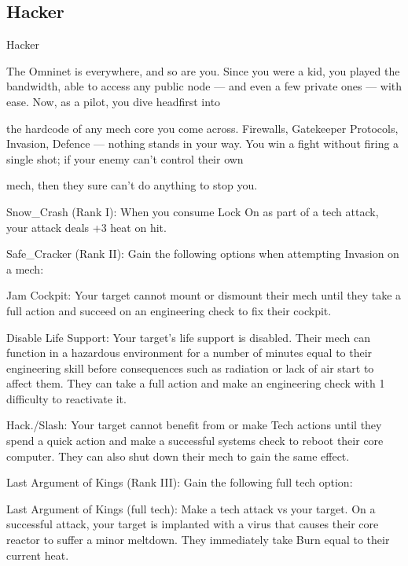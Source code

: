 \subsection{Hacker}

                                                     Hacker  

The Omninet is everywhere, and so are you. Since you were a kid, you played the bandwidth, able to  
access any public node — and even a few private ones — with ease. Now, as a pilot, you dive headfirst into  

the hardcode of any mech core you come across. Firewalls, Gatekeeper Protocols, Invasion, Defence —  
nothing stands in your way. You win a fight without firing a single shot; if your enemy can’t control their own  

mech, then they sure can’t do anything to stop you.   

Snow\_Crash (Rank I): When you consume Lock On as part of a tech attack, your attack deals  
+3 heat on hit.
 
Safe\_Cracker (Rank II): Gain the following options when attempting Invasion on a mech:
 
         Jam Cockpit: Your target cannot mount or dismount their mech until they take a full  
         action and succeed on an engineering check to fix their cockpit.
 
         Disable Life Support: Your target’s life support is disabled. Their mech can function in a  
         hazardous environment for a number of minutes equal to their engineering skill before  
         consequences such as radiation or lack of air start to affect them. They can take a full  
         action and make an engineering check with 1 difficulty to reactivate it.
 
         Hack./Slash: Your target cannot benefit from or make Tech actions until they spend a  
         quick action and make a successful systems check to reboot their core computer. They  
         can also shut down their mech to gain the same effect.
 
Last Argument of Kings (Rank III): Gain the following full tech option:
 
	        Last Argument of Kings (full tech): Make a tech attack vs your target. On a successful  
attack, your target is implanted with a virus that causes their core reactor to suffer a minor  
meltdown. They immediately take Burn equal to their current heat.
 